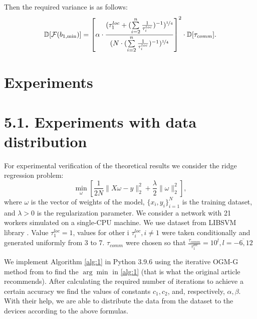 \documentclass{article}
\theoremstyle{definition}
\theoremstyle{plain}
\begin{document}
Then the required variance is as follows:
\begin{equation*}
    \label{eq:20}
    \mathbb D [\mathcal{F}(b_{1, {\min}})] = \left[\alpha\cdot\frac{(\tau_1^{loc} + (\sum\limits_{i = 2}^n \frac{1}{\tau_i^{loc}})^{-1})^{\nicefrac{1}{4}}}{(N\cdot (\sum\limits_{i = 2}^n \frac{1}{\tau_i^{loc}})^{-1})^{\nicefrac{1}{4}}}\right]^2\cdot \mathbb D [\tau_{comm}].
\end{equation*}


\section{Experiments}

\section*{5.1. Experiments with data distribution}
For experimental verification of the theoretical results we consider the ridge regression problem: 
\begin{equation}
    \label{ridge}
    \underset{\omega}{\min}[ \frac{1}{2N} \|X\omega - y\|_2^2 + \frac{\lambda}{2}\|\omega\|_2^2],
\end{equation}
where $\omega$ is the vector of weights of the model, $\{x_i, y_i\}_{i = 1}^N$ is the training dataset, and $\lambda > 0$ is the regularization parameter. We consider a network  with 21 workers simulated on a single-CPU machine. We use dataset from LIBSVM library \cite{chang2011libsvm}. Value $\tau_1^{loc} = 1$, values for other i $\tau_i^{loc}, i \neq 1$ were taken conditionally and generated uniformly from 3 to 7. $\tau_{comm}$ were chosen so that $\frac{\tau _{comm}}{\tau _1^{loc}} = 10^l, l = \overline{-6, 12}$

\begin{comment}
In the first stages $\arg\underset{x}{\min} [p(x_k^g) + <\nabla p(x_k^g), x - x_k^g> + \frac{1}{2\Theta}||x - x_k^g||^2 + q(x)]$ was searched explicitly (Line 5 of Algorithm 1). This was done by equating the gradient to zero. Applying to the problem \ref{ridge}: 
\begin{center}
$\nabla p(\omega_k^g) + \frac{1}{\Theta}(x - \omega_k^g) + \nabla q(x) = 0 \Rightarrow \lambda \omega_k^g + \frac{1}{\Theta}(Ix - \omega_k^g) + \frac{1}{N}X^T(Xx - y) = 0 \Rightarrow$

    
$ x = (I \frac{1}{\Theta} + \frac{1}{N}X^TX)^{-1}(\frac{1}{\Theta} \omega_k^g + \frac{1}{N}X^Ty - \lambda \omega_k^g) $
\end{center}

Then in Algorithm 1 on line 5: $x_f^{k+1} = x$
\end{comment}
 We implement Algorithm \ref{alg:1} in Python 3.9.6 using the iterative OGM-G method from \cite{kim2021optimizing} to find the $\arg\min$ in \ref{alg:1} (that is what the original article \cite{kovalev2022optimal} recommends). After calculating the required number of iterations to achieve a certain accuracy we find the values of constants $c_1, c_2$, and, respectively, $\alpha, \beta$. With their help, we are able to distribute the data from the dataset to the devices according to the above formulas. 
\end{document}
